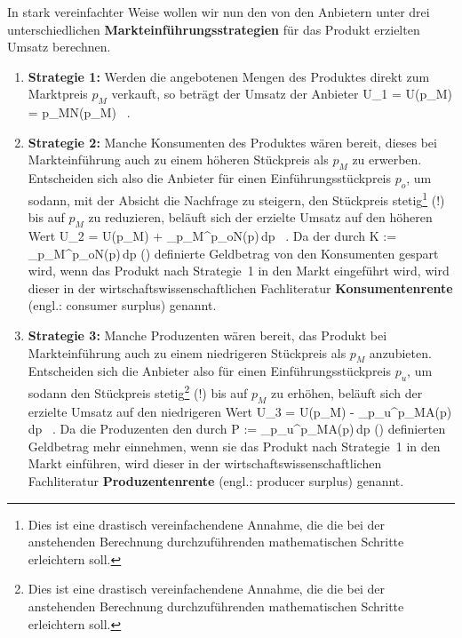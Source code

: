 \medskip
\noindent
In stark vereinfachter Weise wollen wir nun den von den
Anbietern unter drei unterschiedlichen
{\bf Markteinf\"uhrungsstrategien} f\"ur das Produkt erzielten
Umsatz berechnen.
%
\begin{enumerate}

\item {\bf Strategie 1:} Werden die angebotenen Mengen des Produktes
direkt zum Marktpreis $p_{M}$ verkauft, so betr\"agt der Umsatz der
Anbieter
%
\be
U_{1} = U(p_{M}) = p_{M}N(p_{M}) \ .
\ee
%

\item {\bf Strategie 2:} Manche Konsumenten des Produktes w\"aren
bereit, dieses bei Markteinf\"uhrung auch zu einem h\"oheren
St\"uckpreis als $p_{M}$ zu erwerben. Entscheiden sich also die
Anbieter f\"ur einen Einf\"uhrungsst\"uckpreis $p_{o}$, um sodann,
mit der Absicht die Nachfrage zu steigern, den St\"uckpreis
stetig\footnote{Dies ist eine drastisch vereinfachendene Annahme,
die die bei der anstehenden Berechnung durchzuf\"uhrenden
mathematischen Schritte erleichtern soll.} (!) bis auf $p_{M}$ zu
reduzieren, bel\"auft sich der erzielte Umsatz auf den h\"oheren
Wert
%
\be
U_{2} = U(p_{M}) + \int_{p_{M}}^{p_{o}}N(p)\,{\rm d}p \ .
\ee
%
Da der durch
%
\be
K := \int_{p_{M}}^{p_{o}}N(p)\,{\rm d}p \qquad
()
\ee
%
definierte Geldbetrag von den Konsumenten gespart wird, wenn
das Produkt nach Strategie~1 in den Markt eingef\"uhrt wird,
wird dieser in der wirtschaftswissenschaftlichen Fachliteratur
{\bf Konsumentenrente} (engl.: consumer surplus) genannt.

\item {\bf Strategie 3:} Manche Produzenten w\"aren bereit, das
Produkt bei Markteinf\"uhrung auch zu einem niedrigeren
St\"uckpreis als $p_{M}$ anzubieten. Entscheiden sich die Anbieter
also f\"ur einen Einf\"uhrungsst\"uckpreis $p_{u}$, um sodann
den St\"uckpreis stetig\footnote{Dies ist eine drastisch
vereinfachendene Annahme, die die bei der anstehenden Berechnung
durchzuf\"uhrenden mathematischen Schritte erleichtern soll.} (!)
bis auf $p_{M}$ zu erh\"ohen, bel\"auft sich der erzielte Umsatz
auf den niedrigeren Wert
%
\be
U_{3} = U(p_{M}) - \int_{p_{u}}^{p_{M}}A(p)\,{\rm d}p \ .
\ee
%
Da die Produzenten den durch
%
\be
P := \int_{p_{u}}^{p_{M}}A(p)\,{\rm d}p \qquad
()
\ee
%
definierten Geldbetrag mehr einnehmen, wenn sie das Produkt nach
Strategie~1 in den Markt einf\"uhren, wird dieser in der
wirtschaftswissenschaftlichen Fachliteratur {\bf Produzentenrente}
(engl.: producer surplus) genannt.

\end{enumerate}
%

